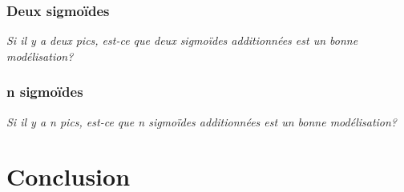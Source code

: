 \documentclass{article}
\begin{document}
\subsubsection{Deux sigmoïdes}
\textit{Si il y a deux pics, est-ce que deux sigmoïdes additionnées est un bonne modélisation?}

\subsubsection{n sigmoïdes}
\textit{Si il y a n pics, est-ce que n sigmoïdes additionnées est un bonne modélisation?}

\section{Conclusion}
\end{document}
